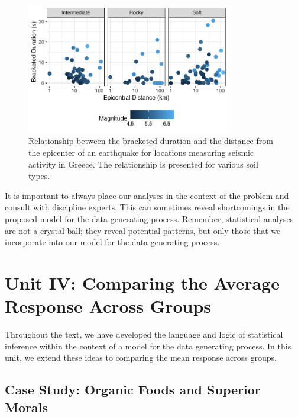 \documentclass[
  letterpaper,
  DIV=11,
  numbers=noendperiod]{scrreprt}
\theoremstyle{plain}
\theoremstyle{definition}
\theoremstyle{definition}
\theoremstyle{remark}
\begin{document}
\begin{figure}

{\centering \includegraphics[width=0.8\textwidth,height=\textheight]{./images/fig-regrecap-multivariable-1.pdf}

}

\caption{\label{fig-regrecap-multivariable}Relationship between the
bracketed duration and the distance from the epicenter of an earthquake
for locations measuring seismic activity in Greece. The relationship is
presented for various soil types.}

\end{figure}

It is important to always place our analyses in the context of the
problem and consult with discipline experts. This can sometimes reveal
shortcomings in the proposed model for the data generating process.
Remember, statistical analyses are not a crystal ball; they reveal
potential patterns, but only those that we incorporate into our model
for the data generating process.

\part{Unit IV: Comparing the Average Response Across Groups}

Throughout the text, we have developed the language and logic of
statistical inference within the context of a model for the data
generating process. In this unit, we extend these ideas to comparing the
mean response across groups.

\hypertarget{sec-caseorganic}{%
\chapter{Case Study: Organic Foods and Superior
Morals}\label{sec-caseorganic}}
\end{document}
